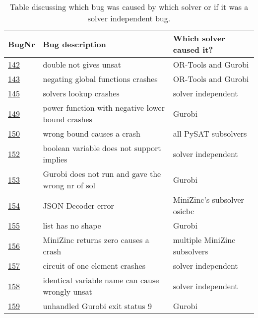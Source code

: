 \begin{table}[]
	\centering
	\caption{Table discussing which bug was caused by which solver or if it was a solver independent bug.}
	\label{tab:bug:Solver}
	\begin{tabular}{lll}
		\hline
		BugNr & Bug description                                           & Which solver caused it?\\ \toprule
		\href{https://github.com/CPMpy/cpmpy/issues/142}{142} & double not gives unsat                            & OR-Tools and Gurobi          \\
		\href{https://github.com/CPMpy/cpmpy/issues/143}{143} & negating global functions crashes                 & OR-Tools and Gurobi          \\
		\href{https://github.com/CPMpy/cpmpy/issues/145}{145} & solvers lookup crashes                            & solver independent           \\
		\href{https://github.com/CPMpy/cpmpy/issues/149}{149} & power function with negative lower bound crashes  & Gurobi                       \\
		\href{https://github.com/CPMpy/cpmpy/issues/150}{150} & wrong bound causes a crash                  & all PySAT subsolvers         \\
		\href{https://github.com/CPMpy/cpmpy/issues/152}{152} & boolean variable does not support implies         & solver independent           \\
		\href{https://github.com/CPMpy/cpmpy/issues/153}{153} & Gurobi does not run and gave the wrong nr of sol  & Gurobi                       \\
		\href{https://github.com/CPMpy/cpmpy/issues/154}{154} & JSON Decoder error                                & MiniZinc's subsolver osicbc  \\
		\href{https://github.com/CPMpy/cpmpy/issues/155}{155} & list has no shape                                 & Gurobi                       \\
		\href{https://github.com/CPMpy/cpmpy/issues/156}{156} & MiniZinc returns zero causes a crash              & multiple MiniZinc subsolvers \\
		\href{https://github.com/CPMpy/cpmpy/issues/157}{157} & circuit of one element crashes                    & solver independent           \\
		\href{https://github.com/CPMpy/cpmpy/issues/158}{158} & identical variable name can cause wrongly unsat   & solver independent           \\
		\href{https://github.com/CPMpy/cpmpy/issues/159}{159} & unhandled Gurobi exit status 9                    & Gurobi                       \\

\end{tabular}
\end{table}
